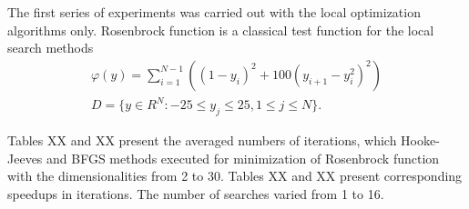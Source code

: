 \documentclass[runningheads]{llncs}
\begin{document}
The first series of experiments was carried out with the local optimization algorithms only. Rosenbrock function is a classical test function for the local search methods 
\begin{gather}
    \varphi(y) = \sum_{i=1}^{N-1} \left((1-y_i)^2 + 100(y_{i+1} - y_i^2)^2\right) \nonumber \\
    D = \{ y \in R^N: -25 \leq y_j \leq 25, 1 \leq j \leq N \}. \nonumber
\end{gather}

Tables XX and XX present the averaged numbers of iterations, which Hooke-Jeeves and BFGS methods executed for minimization of Rosenbrock function with the dimensionalities from 2 to 30. Tables XX and XX present corresponding speedups in iterations. The number of searches varied from 1 to 16. 

%
\end{document}
